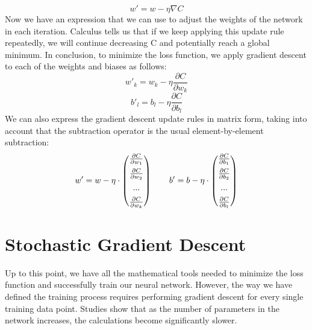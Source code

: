 \documentclass[../main]{subfiles}
\begin{document}
\begin{equation*}
    w' = w -\eta \nabla C
\end{equation*}
Now we have an expression that we can use to adjust the weights of the network in each iteration. Calculus tells us that if we keep applying this update rule repeatedly, we will continue decreasing C and potentially reach a global minimum. In conclusion, to minimize the loss function, we apply gradient descent to each of the weights and biases as follows:
\begin{equation*}
    w'_k = w_k - \eta \frac{\partial C}{\partial w_k}
\end{equation*}
\begin{equation*}
    b'_l = b_l - \eta \frac{\partial C}{\partial b_l}
\end{equation*}
We can also express the gradient descent update rules in matrix form, taking into account that the subtraction operator is the usual element-by-element subtraction:
\begin{equation*}
w' = w-\eta\cdot\begin{pmatrix}
\frac{\partial C}{\partial w_{1}}\vspace{0.15cm}\\ 
\frac{\partial C}{\partial w_{2}}\vspace{0.15cm}\\ 
...\vspace{0.15cm}\\
\frac{\partial C}{\partial w_{k}}
\end{pmatrix}
\quad \quad b' = b - \eta \cdot \begin{pmatrix}
\frac{\partial C}{\partial b_{1}} \vspace{0.15cm}\\ 
\frac{\partial C}{\partial b_{2}} \vspace{0.15cm}\\ 
...       \vspace{0.15cm}\\
\frac{\partial C}{\partial b_{l}}
\end{pmatrix}
\end{equation*}
\section{Stochastic Gradient Descent}
Up to this point, we have all the mathematical tools needed to minimize the loss function and successfully train our neural network. However, the way we have defined the training process requires performing gradient descent for every single training data point. Studies show that as the number of parameters in the network increases, the calculations become significantly slower.
\end{document}
